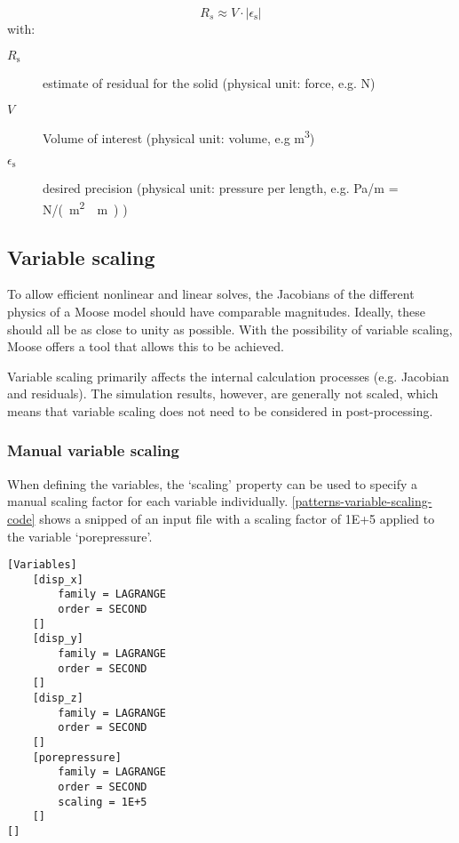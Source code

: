 \begin{equation}
  \label{patterns:eq:residual-solid}
  R_{s} \approx V \cdot \left|\epsilon_\mathrm{s}\right|
\end{equation}
with:
\begin{description}
  \item[$R_\mathrm{s}$] estimate of residual for the solid (physical unit: force, e.g. \unit{\newton})
  \item[$V$] Volume of interest (physical unit: volume, e.g \unit{\cubic\metre})
  \item[$\epsilon_\mathrm{s}$] desired precision (physical unit: pressure per length, e.g. \unit[per-mode = symbol]{\pascal\per\metre} = \unit[per-mode = symbol]{\newton\per(\square\metre\cdot\metre)} )
\end{description}

\subsection{Variable scaling}
\label{patterns:variable-scaling}

To allow efficient nonlinear and linear solves, the Jacobians of the different
physics of a Moose model should have comparable magnitudes. Ideally, these
should all be as close to unity as possible. With the possibility of variable
scaling, Moose offers a tool that allows this to be achieved.

Variable scaling primarily affects the internal calculation processes (e.g.
Jacobian and residuals). The simulation results, however, are generally not
scaled, which means that variable scaling does not need to be considered in
post-processing.

\subsubsection{Manual variable scaling}

When defining the variables, the ‘scaling’ property can be used to specify a
manual scaling factor for each variable individually.
\autoref{patterns-variable-scaling-code} shows a snipped of an input file with
a scaling factor of \qty{1E+5}{} applied to the variable ‘porepressure’.

\begin{lstlisting}[language=Moose, caption={Variable definition with scaling on porepressure in a Moose inut file},label={patterns-variable-scaling-code}]
[Variables]
    [disp_x]
        family = LAGRANGE
        order = SECOND
    []
    [disp_y]
        family = LAGRANGE
        order = SECOND
    []
    [disp_z]
        family = LAGRANGE
        order = SECOND
    []
    [porepressure]
        family = LAGRANGE
        order = SECOND
        scaling = 1E+5
    []
[]
\end{lstlisting}

